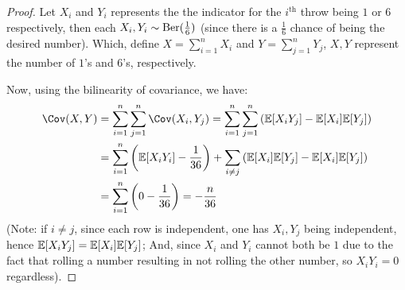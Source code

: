 \documentclass{article}
\begin{document}
\begin{proof}
    Let $X_i$ and $Y_i$ represents the the indicator for the $i^\text{th}$ throw being $1$ or $6$ respectively, then each $X_i, Y_i \sim \mathrm{Ber}(\frac{1}{6})$ (since there is a $\frac{1}{6}$ chance of being the desired number). Which, define $X=\sum_{i=1}^{n}X_i$ and $Y=\sum_{j=1}^{n}Y_j$, $X,Y$ represent the number of $1$'s and $6$'s, respectively.

    \hfil

    Now, using the bilinearity of covariance, we have:
    \begin{align}
        \Cov(X,Y) &= \sum_{i=1}^{n}\sum_{j=1}^{n}\Cov(X_i, Y_j) = \sum_{i=1}^{n}\sum_{j=1}^{n}\left(\EE[X_i Y_j] - \EE[X_i]\EE[Y_j]\right)\\ 
        &= \sum_{i=1}^{n}\left(\EE[X_i Y_i]-\frac{1}{36}\right) + \sum_{i\neq j}\left(\EE[X_i]\EE[Y_j] - \EE[X_i]\EE[Y_j]\right)\\
        &= \sum_{i=1}^{n}\left(0-\frac{1}{36}\right) = -\frac{n}{36}
    \end{align}
    (Note: if $i\neq j$, since each row is independent, one has $X_i, Y_j$ being independent, hence $\mathbb{E}[X_iY_j]=\mathbb{E}[X_i]\mathbb{E}[Y_j]$; And, since $X_i$ and $Y_i$ cannot both be $1$ due to the fact that rolling a number resulting in not rolling the other number, so $X_i Y_i=0$ regardless).

\end{proof}
\end{document}
